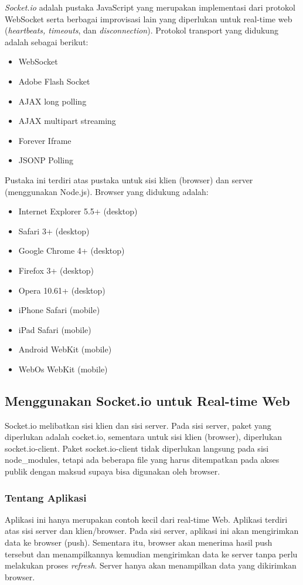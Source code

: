 \textit{Socket.io} adalah pustaka JavaScript yang merupakan implementasi dari protokol WebSocket serta berbagai improvisasi lain yang diperlukan untuk real-time web (\textit{heartbeats, timeouts}, dan \textit{disconnection}). Protokol transport yang didukung adalah sebagai berikut:
\begin{itemize}
\item WebSocket
\item Adobe Flash Socket
\item AJAX long polling
\item AJAX multipart streaming
\item Forever Iframe
\item JSONP Polling
\end{itemize}
Pustaka ini terdiri atas pustaka untuk sisi klien (browser) dan server (menggunakan Node.js). Browser yang didukung adalah:
\begin{itemize}
\item Internet Explorer 5.5+ (desktop)
\item Safari 3+ (desktop)
\item Google Chrome 4+ (desktop)
\item Firefox 3+ (desktop)
\item Opera 10.61+ (desktop)
\item iPhone Safari (mobile)
\item iPad Safari (mobile)
\item Android WebKit (mobile)
\item WebOs WebKit (mobile)
\end{itemize}

\subsection{Menggunakan Socket.io untuk Real-time Web}

Socket.io melibatkan sisi klien dan sisi server. Pada sisi server, paket yang diperlukan adalah cocket.io, sementara untuk sisi klien (browser), diperlukan socket.io-client. Paket socket.io-client tidak diperlukan langsung pada sisi node\_modules, tetapi ada beberapa file yang harus ditempatkan pada akses publik dengan maksud supaya bisa digunakan oleh browser. 

\subsubsection{Tentang Aplikasi}

Aplikasi ini hanya merupakan contoh kecil dari real-time Web. Aplikasi terdiri atas sisi server dan klien/browser. Pada sisi server, aplikasi ini akan mengirimkan data ke browser (push). Sementara itu, browser akan menerima hasil push tersebut dan menampilkannya kemudian mengirimkan data ke server tanpa perlu melakukan proses \textit{refresh}. Server hanya akan menampilkan data yang dikirimkan browser. 

